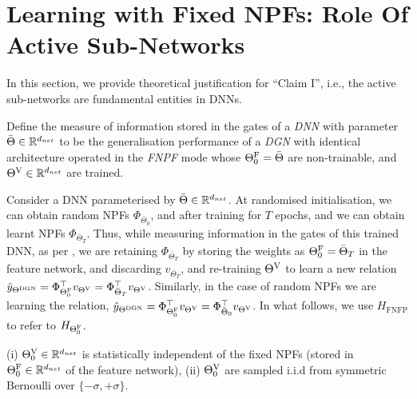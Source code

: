\section{Learning with Fixed NPFs: Role Of Active Sub-Networks}\label{sec:infomeasure}
In this section, we provide theoretical justification for ``Claim I'', i.e., the active sub-networks are fundamental entities in DNNs. 
\begin{definition}\label{def:gateinfo}
Define the measure of information stored in the gates of a \emph{DNN} with parameter $\bar{\Theta}\in\mathbb{R}^{d_{net}}$ to be the generalisation performance of a \emph{DGN} with identical architecture operated in the \emph{FNPF} mode whose ${\Theta}^{\text{F}}_0=\bar{\Theta}$ are non-trainable, and ${\Theta}^{\text{V}}\in\mathbb{R}^{d_{net}}$ are trained.
\end{definition}
Consider a DNN parameterised by $\bar{\Theta}\in\mathbb{R}^{d_{net}}$. At randomised initialisation, we can obtain random NPFs $\Phi_{\bar{\Theta}_0}$, and after training for $T$ epochs, and we can obtain learnt NPFs $\Phi_{\bar{\Theta}_T}$. 
Thus, while measuring information in the gates of this trained DNN, as per , we are retaining $\Phi_{\bar{\Theta}_T}$ by storing the weights as ${\Theta}^{\text{F}}_0=\bar{\Theta}_T$ in the feature network, and discarding $v_{\bar{\Theta}_T}$, and re-training ${\Theta}^{\text{V}}$ to learn a new relation $\hat{y}_{\Theta^{\text{DGN}}}=\Phi^\top_{{\Theta}^{\text{F}}_0}v_{{\Theta}^{\text{V}}}=\Phi^\top_{\bar{\Theta}_T}v_{{\Theta}^{\text{V}}}$. Similarly, in the case of random NPFs we are learning the relation, $\hat{y}_{\Theta^{\text{DGN}}}=\Phi^\top_{{\Theta}^{\text{F}}_0}v_{{\Theta}^{\text{V}}}=\Phi^\top_{\bar{\Theta}_0}v_{{\Theta}^{\text{V}}}$. In what follows, we use $H_{\text{FNFP}}$ to refer to $H_{{\Theta}^{\text{F}}_0}$.
\begin{assumption}\label{assmp:main}
(i) ${\Theta}^{\text{V}}_0\in\mathbb{R}^{d_{net}}$ is statistically independent of the fixed NPFs (stored in ${\Theta}^{\text{F}}_0\in\mathbb{R}^{d_{net}}$ of the feature network), (ii) ${\Theta}^{\text{V}}_0$ are sampled i.i.d from symmetric Bernoulli over $\{-\sigma,+\sigma\}$.
\end{assumption}
